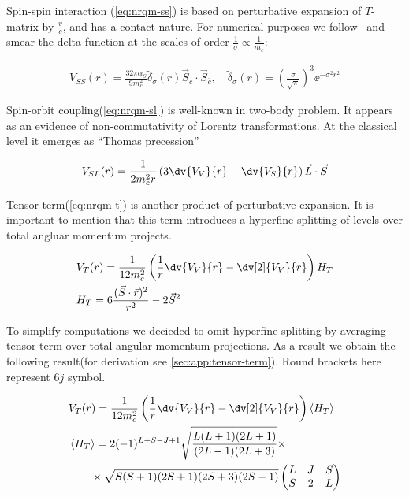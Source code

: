 Spin-spin interaction (\cref{eq:nrqm-ss}) is based on perturbative expansion of $T$-matrix by $\frac{v}{c}$, and has a contact nature. For numerical purposes we follow~\cite{gbs-model} and smear the delta-function at the scales of order $\frac{1}{\sigma} \propto \frac{1}{m_c}$:

\begin{align} \label{eq:nrqm-ss}
    V_{SS}(r) = \frac{32 \pi \alpha_S}{9 m_c^2} \tilde{\delta}_\sigma(r) \vec{S}_c \cdot \vec{S}_{\bar{c}},\quad \tilde{\delta}_\sigma(r) = \left(\frac{\sigma}{\sqrt{\pi}}\right)^3 \ee^{-\sigma^2 r^2}
\end{align}

Spin-orbit coupling(\cref{eq:nrqm-sl}) is well-known in two-body problem. It appears as an evidence of non-commutativity of Lorentz transformations. At the classical level it emerges as ``Thomas precession''~\cite{thomas}

\begin{align} \label{eq:nrqm-sl}
    V_{SL}(r) = \frac{1}{2 m_c^2 r} \left( 3 \dv{V_V}{r} - \dv{V_S}{r} \right) \vec{L} \cdot \vec{S}
\end{align}

Tensor term(\cref{eq:nrqm-t}) is another product of perturbative expansion. It is important to mention that this term introduces a hyperfine splitting of levels over total angluar momentum projects.

\begin{align} \label{eq:nrqm-t}
    &V_T(r) = \frac{1}{12 m_c^2} \left( \frac{1}{r} \dv{V_V}{r} - \dv[2]{V_V}{r} \right) H_T \\
    &H_T = 6\frac{(\vec{S} \cdot \vec{r})^2}{r^2} - 2\vec{S}^2
\end{align}

To simplify computations we decieded to omit hyperfine splitting by averaging tensor term over total angular momentum projections. As a result we obtain the following result(for derivation see \cref{sec:app:tensor-term}). Round brackets here represent $6j$ symbol.

\begin{align}
    &V_T(r) = \frac{1}{12 m_c^2} \left( \frac{1}{r} \dv{V_V}{r} - \dv[2]{V_V}{r} \right) \left<H_T\right> \\
    &\left<H_T\right> = 2 (-1)^{L+S-J+1} \sqrt{\frac{L(L+1)(2L+1)}{(2L-1)(2L+3)}} \times \nonumber \\
    &\qquad \times \sqrt{S(S+1)(2S+1)(2S+3)(2S-1)} \left( \begin{matrix}
                                                L & J & S \\
                                                S & 2 & L
                                              \end{matrix} \right)
\end{align}

